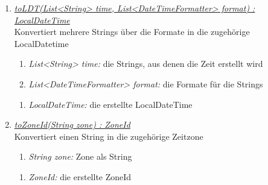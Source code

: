 \begin{enumerate}[+]
	\item \underline{\textit{toLDT(List<String> time, List<DateTimeFormatter> format) : LocalDateTime}}\\
	Konvertiert mehrere Strings über die Formate in die zugehörige LocalDatetime
	\begin{enumerate}[$\bullet$]
		\item \textit{List<String> time:} die Strings, aus denen die Zeit erstellt wird
		\item \textit{List<DateTimeFormatter> format:} die Formate für die Strings
	\end{enumerate}
	\vspace{-0.2cm}
	\begin{enumerate}[$\circ$]
		\item \textit{LocalDateTime:} die erstellte LocalDateTime
	\end{enumerate}
	
	\item \underline{\textit{toZoneId(String zone) : ZoneId}}\\
	Konvertiert einen String in die zugehörige Zeitzone
	\begin{enumerate}[$\bullet$]
		\item \textit{String zone:} Zone als String
	\end{enumerate}
	\vspace{-0.2cm}
	\begin{enumerate}[$\circ$]
		\item \textit{ZoneId:} die erstellte ZoneId
	\end{enumerate}

\end{enumerate}